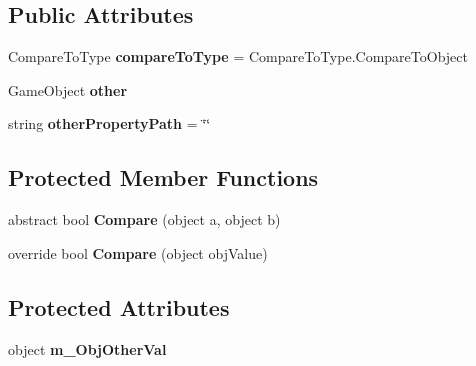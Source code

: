 \subsection*{Public Attributes}
\begin{DoxyCompactItemize}
\item 
\mbox{\label{class_unity_test_1_1_comparer_base_aced0cf0379e0032849465af8101b8764}} 
Compare\+To\+Type {\bfseries compare\+To\+Type} = Compare\+To\+Type.\+Compare\+To\+Object
\item 
\mbox{\label{class_unity_test_1_1_comparer_base_afdb8ad4406ee6d1e93a3b26325b55004}} 
Game\+Object {\bfseries other}
\item 
\mbox{\label{class_unity_test_1_1_comparer_base_a3cda6db8399b8d0de2edf36faa03b404}} 
string {\bfseries other\+Property\+Path} = \char`\"{}\char`\"{}
\end{DoxyCompactItemize}
\subsection*{Protected Member Functions}
\begin{DoxyCompactItemize}
\item 
\mbox{\label{class_unity_test_1_1_comparer_base_a20d09aaa6bb79f63781f3067a982dcbb}} 
abstract bool {\bfseries Compare} (object a, object b)
\item 
\mbox{\label{class_unity_test_1_1_comparer_base_a88ec958c7a5ee4bdbb68a88f3f166de1}} 
override bool {\bfseries Compare} (object obj\+Value)
\end{DoxyCompactItemize}
\subsection*{Protected Attributes}
\begin{DoxyCompactItemize}
\item 
\mbox{\label{class_unity_test_1_1_comparer_base_a52970bd0bd873043f5df11601ddd14d9}} 
object {\bfseries m\+\_\+\+Obj\+Other\+Val}
\end{DoxyCompactItemize}
